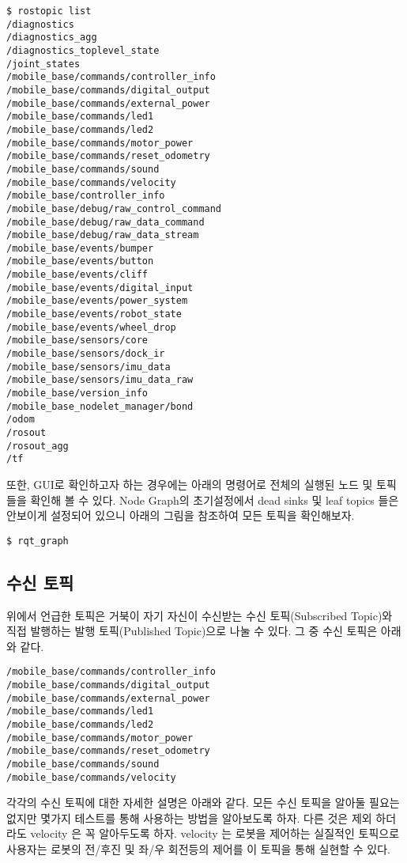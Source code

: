 \begin{lstlisting}[language=ROS]
$ rostopic list
/diagnostics
/diagnostics_agg
/diagnostics_toplevel_state
/joint_states
/mobile_base/commands/controller_info
/mobile_base/commands/digital_output
/mobile_base/commands/external_power
/mobile_base/commands/led1
/mobile_base/commands/led2
/mobile_base/commands/motor_power
/mobile_base/commands/reset_odometry
/mobile_base/commands/sound
/mobile_base/commands/velocity
/mobile_base/controller_info
/mobile_base/debug/raw_control_command
/mobile_base/debug/raw_data_command
/mobile_base/debug/raw_data_stream
/mobile_base/events/bumper
/mobile_base/events/button
/mobile_base/events/cliff
/mobile_base/events/digital_input
/mobile_base/events/power_system
/mobile_base/events/robot_state
/mobile_base/events/wheel_drop
/mobile_base/sensors/core
/mobile_base/sensors/dock_ir
/mobile_base/sensors/imu_data
/mobile_base/sensors/imu_data_raw
/mobile_base/version_info
/mobile_base_nodelet_manager/bond
/odom
/rosout
/rosout_agg
/tf
\end{lstlisting}

또한, GUI로 확인하고자 하는 경우에는 아래의 명령어로 전체의 실행된 노드 및 토픽들을 확인해 볼 수 있다. Node Graph의 초기설정에서 dead sinks 및 leaf topics 들은 안보이게 설정되어 있으니 아래의 그림을 참조하여 모든 토픽을 확인해보자.

\begin{lstlisting}[language=ROS]
$ rqt_graph
\end{lstlisting}

\subsection{수신 토픽}

위에서 언급한 토픽은 거북이 자기 자신이 수신받는 수신 토픽(Subscribed Topic)와 직접 발행하는 발행 토픽(Published Topic)으로 나눌 수 있다. 그 중 수신 토픽은 아래와 같다.

\begin{lstlisting}[language=ROS]
/mobile_base/commands/controller_info
/mobile_base/commands/digital_output
/mobile_base/commands/external_power
/mobile_base/commands/led1
/mobile_base/commands/led2
/mobile_base/commands/motor_power
/mobile_base/commands/reset_odometry
/mobile_base/commands/sound
/mobile_base/commands/velocity
\end{lstlisting}

각각의 수신 토픽에 대한 자세한 설명은 아래와 같다. 모든 수신 토픽을 알아둘 필요는 없지만 몇가지 테스트를 통해 사용하는 방법을 알아보도록 하자. 다른 것은 제외 하더라도 velocity 은 꼭 알아두도록 하자. velocity 는 로봇을 제어하는 실질적인 토픽으로 사용자는 로봇의 전/후진 및 좌/우 회전등의 제어를 이 토픽을 통해 실현할 수 있다.

